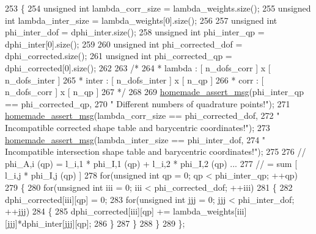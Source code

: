 \begin{DoxyCode}
253     \{
254         \textcolor{keywordtype}{unsigned} \textcolor{keywordtype}{int} lambda\_corr\_size   = lambda\_weights.size();
255         \textcolor{keywordtype}{unsigned} \textcolor{keywordtype}{int} lambda\_inter\_size  = lambda\_weights[0].size();
256 
257         \textcolor{keywordtype}{unsigned} \textcolor{keywordtype}{int} phi\_inter\_dof      = dphi\_inter.size();
258         \textcolor{keywordtype}{unsigned} \textcolor{keywordtype}{int} phi\_inter\_qp       = dphi\_inter[0].size();
259 
260         \textcolor{keywordtype}{unsigned} \textcolor{keywordtype}{int} phi\_corrected\_dof      = dphi\_corrected.size();
261         \textcolor{keywordtype}{unsigned} \textcolor{keywordtype}{int} phi\_corrected\_qp       = dphi\_corrected[0].size();
262 
263         \textcolor{comment}{/*}
264 \textcolor{comment}{        *       lambda  : [ n\_dofs\_corr ] x [ n\_dofs\_inter ]}
265 \textcolor{comment}{        *       inter   : [ n\_dofs\_inter ] x [ n\_qp ]}
266 \textcolor{comment}{        *       corr    : [ n\_dofs\_corr ] x [ n\_qp ]}
267 \textcolor{comment}{        */}
268 
269         \hyperlink{common__header_8h_a593ccc80b790b2268653fcf6597bf451}{homemade\_assert\_msg}(phi\_inter\_qp == phi\_corrected\_qp,
270                         \textcolor{stringliteral}{" Different numbers of quadrature points!"});
271         \hyperlink{common__header_8h_a593ccc80b790b2268653fcf6597bf451}{homemade\_assert\_msg}(lambda\_corr\_size == phi\_corrected\_dof,
272                         \textcolor{stringliteral}{" Incompatible corrected shape table and barycentric coordinates!"});
273         \hyperlink{common__header_8h_a593ccc80b790b2268653fcf6597bf451}{homemade\_assert\_msg}(lambda\_inter\_size == phi\_inter\_dof,
274                         \textcolor{stringliteral}{" Incompatible intersection shape table and barycentric coordinates!"});
275 
276         \textcolor{comment}{// phi\_A,i (qp) = l\_i,1 * phi\_I,1 (qp) + l\_i,2 * phi\_I,2 (qp) ...}
277         \textcolor{comment}{//              = sum [ l\_i,j * phi\_I,j (qp) ]}
278         \textcolor{keywordflow}{for}(\textcolor{keywordtype}{unsigned} \textcolor{keywordtype}{int} qp = 0; qp < phi\_inter\_qp; ++qp)
279         \{
280             \textcolor{keywordflow}{for}(\textcolor{keywordtype}{unsigned} \textcolor{keywordtype}{int} iii = 0; iii < phi\_corrected\_dof; ++iii)
281             \{
282                 dphi\_corrected[iii][qp] = 0;
283                 \textcolor{keywordflow}{for}(\textcolor{keywordtype}{unsigned} \textcolor{keywordtype}{int} jjj = 0; jjj < phi\_inter\_dof; ++jjj)
284                 \{
285                     dphi\_corrected[iii][qp] += lambda\_weights[iii][jjj]*dphi\_inter[jjj][qp];
286                 \}
287             \}
288         \}
289     \};
\end{DoxyCode}
\hypertarget{classcarl_1_1assemble__coupling__matrices_a677a3527845b3503cc5f5daa8de63864}{}
